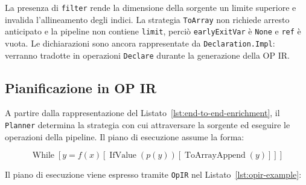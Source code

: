 \documentclass[a4paper,11pt]{report}
\theoremstyle{definition}
\begin{document}
La presenza di \texttt{filter} rende la dimensione della sorgente un limite superiore e invalida l'allineamento degli indici. La strategia \texttt{ToArray} non richiede arresto anticipato e la pipeline non contiene \texttt{limit}, perciò \texttt{earlyExitVar} è \texttt{None} e \texttt{ref} è vuota. Le dichiarazioni sono ancora rappresentate da \texttt{Declaration.Impl}: verranno tradotte in operazioni \texttt{Declare} durante la generazione della OP IR.

\subsection{Pianificazione in OP IR}

A partire dalla rappresentazione del Listato~\ref{lst:end-to-end-enrichment}, il \texttt{Planner} determina la strategia con cui attraversare la sorgente ed eseguire le operazioni della pipeline. Il piano di esecuzione assume la forma:

\[
  \boxed{
    \operatorname{While}
    \left[
      \boxed{
        y = f(x)
        \left[
          \boxed{
            \operatorname{IfValue}(p(y))
            \left[
              \boxed{
                \operatorname{ToArrayAppend}(y)
              }
            \right]
          }
        \right]
      }
    \right]
  }
\]

Il piano di esecuzione viene espresso tramite \texttt{OpIR} nel Listato~\ref{lst:opir-example}:
\end{document}
